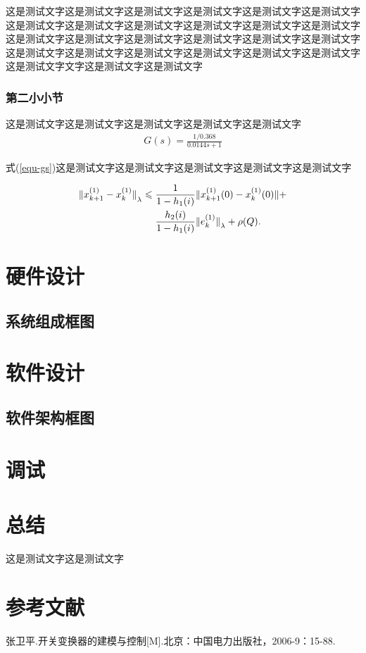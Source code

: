 \documentclass[UTF8,zihao=-4,twoside]{ctexart}
\newcommand{\sect}[1]{\setcounter{figure}{0}\setcounter{table}{0}\setcounter{equation}{0}\section{#1}}
\newcommand{\equstyle}{\setlength\abovedisplayskip{6pt}\setlength\belowdisplayskip{-6pt}}
\begin{document}
            这是测试文字这是测试文字这是测试文字这是测试文字这是测试文字这是测试文字这是测试文字这是测试文字这是测试文字这是测试文字这是测试文字这是测试文字这是测试文字这是测试文字这是测试文字这是测试文字这是测试文字这是测试文字这是测试文字这是测试文字这是测试文字这是测试文字这是测试文字这是测试文字这是测试文字文字这是测试文字这是测试文字
            \subsubsection{第二小小节}
            这是测试文字这是测试文字这是测试文字这是测试文字这是测试文字
                {\equstyle
                \begin{align}
                    G(s)=\frac{1/0.368}{0.0144s+1}
                    \label{equ-gs}
                \end{align}}

            式(\ref{equ-gs})这是测试文字这是测试文字这是测试文字这是测试文字这是测试文字

            \begin{align}
            {\Arrowvert x^{(1)}_{k+1}-x^{(1)}_k\Arrowvert}_\lambda\leqslant \;&
            \frac{1}{1-h_1(i)}\Arrowvert x^{(1)}_{k+1}(0)-x^{(1)}_k(0)\Arrowvert+\notag\\
            &\frac{h_2(i)}{1-h_1(i)}{\Arrowvert
            	e^{(1)}_k\Arrowvert}_\lambda+\rho(Q).
            \end{align}

    \sect{硬件设计}

        \subsection{系统组成框图}


    \sect{软件设计}

        \subsection{软件架构框图}

    \sect{调试}


    \sect{总结}
这是测试文字这是测试文字


    \setcounter{secnumdepth}{-2}

    \section{参考文献}
    \begin{thebibliography}{99}
        \vspace{-1.8em}
        \addtolength{\itemsep}{-0.7em}

        张卫平.\;\;开关变换器的建模与控制[M].\;\;北京：中国电力出版社，2006-9：15-88.

    \end{thebibliography}
\end{document}
